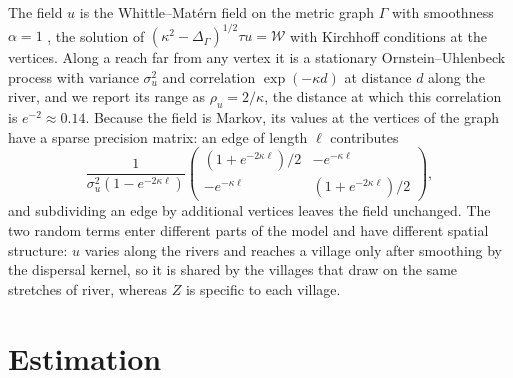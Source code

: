 \documentclass[11pt,a4paper]{article}
\begin{document}
The field $u$ is the Whittle--Mat\'ern field on the metric graph $\Gamma$ with smoothness $\alpha = 1$ \citep{bolin2024}, the solution of $(\kappa^2 - \Delta_\Gamma)^{1/2}\tau u = \mathcal{W}$ with Kirchhoff conditions at the vertices. Along a reach far from any vertex it is a stationary Ornstein--Uhlenbeck process with variance $\sigma_u^2$ and correlation $\exp(-\kappa d)$ at distance $d$ along the river, and we report its range as $\rho_u = 2/\kappa$, the distance at which this correlation is $e^{-2} \approx 0.14$. Because the field is Markov, its values at the vertices of the graph have a sparse precision matrix: an edge of length $\ell$ contributes
\[
\frac{1}{\sigma_u^2(1 - e^{-2\kappa\ell})}\begin{pmatrix} (1 + e^{-2\kappa\ell})/2 & -e^{-\kappa\ell} \\ -e^{-\kappa\ell} & (1 + e^{-2\kappa\ell})/2 \end{pmatrix},
\]
and subdividing an edge by additional vertices leaves the field unchanged. The two random terms enter different parts of the model and have different spatial structure: $u$ varies along the rivers and reaches a village only after smoothing by the dispersal kernel, so it is shared by the villages that draw on the same stretches of river, whereas $Z$ is specific to each village.

\section{Estimation}
\end{document}
